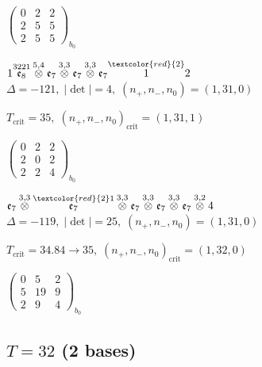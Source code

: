 \documentclass[10pt]{article}
\begin{document}
\hspace{2em}$\left(\begin{smallmatrix}0 & 2 & 2 \\ 2 & 5 & 5 \\ 2 & 5 & 5\end{smallmatrix}\right)_{\!b_0}$

\smallskip

$1\overset{3221}{\mathfrak{e}_8}\overset{5,4}{\otimes}\mathfrak{e}_7\overset{3,3}{\otimes}\mathfrak{e}_7\overset{3,3}{\otimes}\mathfrak{e}_7\overset{\textcolor{red}{2}}{1}2$ \quad $\Delta=-121,\; |\det|=4,\; (n_+,n_-,n_0)=(1,31,0)$

\hspace{1em}$T_{\text{crit}}=35,\; (n_+,n_-,n_0)_{\text{crit}}=(1,31,1)$

\hspace{2em}$\left(\begin{smallmatrix}0 & 2 & 2 \\ 2 & 0 & 2 \\ 2 & 2 & 4\end{smallmatrix}\right)_{\!b_0}$

\smallskip

$\mathfrak{e}_7\overset{3,3}{\otimes}\overset{\textcolor{red}{2}1}{\mathfrak{e}_7}\overset{3,3}{\otimes}\mathfrak{e}_7\overset{3,3}{\otimes}\mathfrak{e}_7\overset{3,3}{\otimes}\mathfrak{e}_7\overset{3,2}{\otimes}4$ \quad $\Delta=-119,\; |\det|=25,\; (n_+,n_-,n_0)=(1,31,0)$

\hspace{1em}$T_{\text{crit}}=34.84 \to 35,\; (n_+,n_-,n_0)_{\text{crit}}=(1,32,0)$

\hspace{2em}$\left(\begin{smallmatrix}0 & 5 & 2 \\ 5 & 19 & 9 \\ 2 & 9 & 4\end{smallmatrix}\right)_{\!b_0}$


\subsection*{$T = 32$ \quad (2 bases)}
\smallskip
\end{document}
